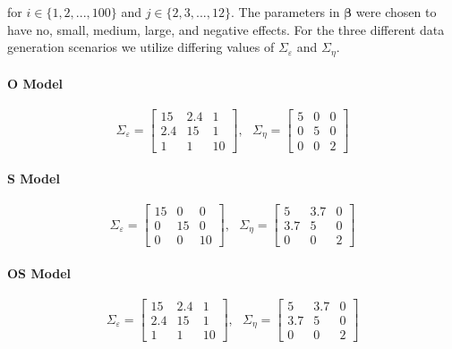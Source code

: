 \documentclass[
]{article}
\begin{document}
for \(i \in \{1, 2, ..., 100\}\) and \(j \in \{2, 3,..., 12\}\). The parameters in \(\boldsymbol{\beta}\) were chosen to have no, small, medium, large, and negative effects. For the three different data generation scenarios we utilize differing values of \(\Sigma_\varepsilon\) and \(\Sigma_\eta\).

\hypertarget{o-model}{%
\paragraph{O Model}\label{o-model}}

\begin{equation}\label{eq:O}
\Sigma_\varepsilon = 
\begin{bmatrix}
15 & 2.4 & 1\\
2.4 & 15 & 1\\
1 & 1 & 10
\end{bmatrix}, \ \ \ 
\Sigma_\eta =
\begin{bmatrix}
5 & 0 & 0\\
0 & 5 & 0\\
0 & 0 & 2
\end{bmatrix}
\end{equation}

\hypertarget{s-model}{%
\paragraph{S Model}\label{s-model}}

\begin{equation}\label{eq:S}
\Sigma_\varepsilon = 
\begin{bmatrix}
15 & 0 & 0\\
0 & 15 & 0\\
0 & 0 & 10
\end{bmatrix}, \ \ \ 
\Sigma_\eta =
\begin{bmatrix}
5 & 3.7 & 0\\
3.7 & 5 & 0\\
0 & 0 & 2
\end{bmatrix}
\end{equation}

\hypertarget{os-model}{%
\paragraph{OS Model}\label{os-model}}

\begin{equation}\label{eq:OS}
\Sigma_\varepsilon = 
\begin{bmatrix}
15 & 2.4 & 1\\
2.4 & 15 & 1\\
1 & 1 & 10
\end{bmatrix}, \ \ \ 
\Sigma_\eta =
\begin{bmatrix}
5 & 3.7 & 0\\
3.7 & 5 & 0\\
0 & 0 & 2
\end{bmatrix}
\end{equation}
\end{document}

